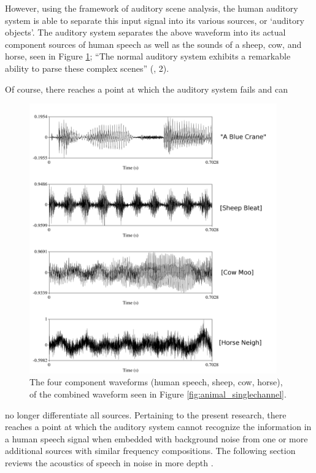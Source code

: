 However, using the framework of auditory scene analysis, the human auditory system is able to separate this input signal into its various sources, or `auditory objects'.  The auditory system separates the above waveform into its actual component sources of human speech as well as the sounds of a sheep, cow, and horse, seen in Figure \ref{fig:animal_multichannel}; ``The normal auditory system exhibits a remarkable ability to parse these complex scenes'' (\cite{middlebrooks:17}, 2).

Of course, there reaches a point at which the auditory system fails and can
%
\begin{figure}[h!]
\centering
  \includegraphics[width=0.95\textwidth]{figure/animal_multichannel-w-text.png}
  \caption{The four component waveforms (human speech, sheep, cow, horse), of the combined waveform seen in Figure \ref{fig:animal_singlechannel}.}
  \label{fig:animal_multichannel}
\end{figure}
%
 no longer differentiate all sources. Pertaining to the present research, there reaches a point at which the auditory system cannot recognize the information in a human speech signal when embedded with background noise from one or more additional sources with similar frequency compositions.  The following section reviews the acoustics of speech in noise in more depth .
  
